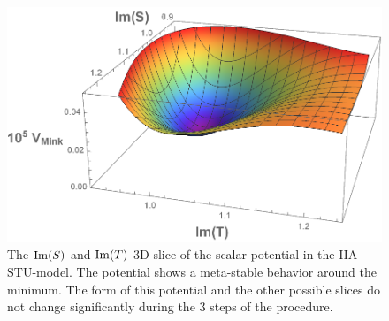 \documentclass[a4paper,12pt,twoside,openright]{report}
\def\rmim{{\rm Im}}
\begin{document}
\begin{figure}[H]\hskip 2cm
\includegraphics[scale=0.6]{3Mod3DLarge.pdf}
\caption{ The $\rmim(S)$ and $\rmim(T)$ 3D slice of the scalar potential in the IIA STU-model. The potential shows a meta-stable behavior around the minimum. The form of this  potential and the other possible slices do not change significantly during the 3 steps of the procedure.}
\label{fig:stu3Dlarge}
\end{figure}
\end{document}
